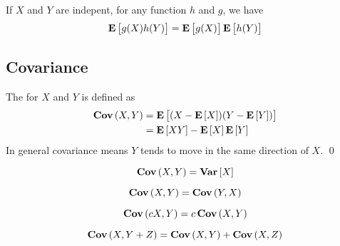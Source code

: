 \begin{theorem}
    If $X$ and $Y$ are indepent, for any function $h$ and $g$, we have
    \begin{equation}
        \expect{g(X) h(Y)} = \expect{g(X)} \expect{h(Y)}
    \end{equation}    
\end{theorem}

\subsection{Covariance}

\begin{definition}[covariance]
    The  for $X$ and $Y$ is defined as 
    \begin{equation}
    \begin{aligned}
        \covariance{X}{Y} &= \expect{(X - \expect{X})(Y - \expect{Y})} \\
        &= \expect{XY} - \expect{X} \expect{Y}
    \end{aligned}
    \end{equation}
    In general covariance means $Y$ tends to move in the same direction of $X$.
    \qed
\end{definition}

\begin{theorem}
    \begin{equation}
        \covariance{X}{Y} = \variance{X}
    \end{equation}    
\end{theorem}

\begin{theorem}
    \begin{equation}
        \covariance{X}{Y} = \covariance{Y}{X}
    \end{equation}    
\end{theorem}

\begin{theorem}
    \begin{equation}
        \covariance{cX}{Y} = c \covariance{X}{Y}
    \end{equation}    
\end{theorem}

\begin{theorem}
    \begin{equation}
        \covariance{X}{Y + Z} = \covariance{X}{Y} + \covariance{X}{Z}
    \end{equation}    
\end{theorem}

